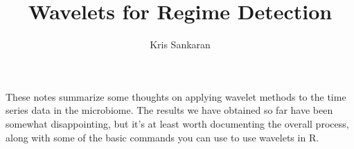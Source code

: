 \documentclass{article}
\title{Wavelets for Regime Detection}
\author{Kris Sankaran}
\begin{document}
\maketitle

These notes summarize some thoughts on applying wavelet methods to the
time series data in the microbiome. The results we have obtained so far have
been somewhat disappointing, but it's at least worth documenting the overall
process, along with some of the basic commands you can use to use wavelets in R.


\end{document}

